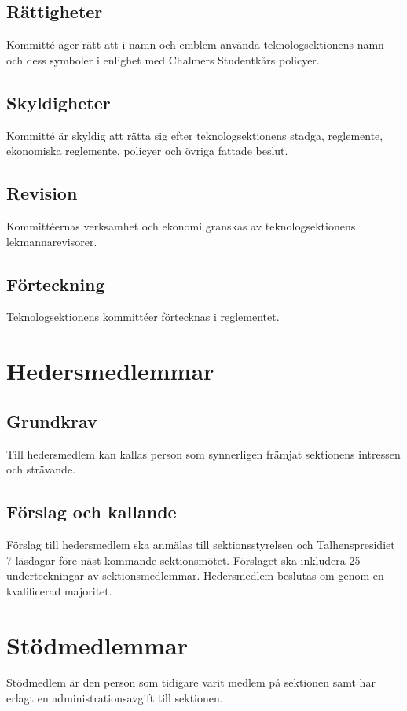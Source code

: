 \documentclass[a4paper]{dtek}
\begin{document}
\subsection{Rättigheter}
Kommitté äger rätt att i namn och emblem använda teknologsektionens namn och dess symboler i enlighet med Chalmers Studentkårs policyer.
\subsection{Skyldigheter}
Kommitté är skyldig att rätta sig efter teknologsektionens stadga, reglemente, ekonomiska reglemente, policyer och övriga fattade beslut.
\subsection{Revision}
Kommittéernas verksamhet och ekonomi granskas av teknologsektionens lekmannarevisorer.
\subsection{Förteckning}
Teknologsektionens kommittéer förtecknas i reglementet.
\newpage

\section{Hedersmedlemmar}
\subsection{Grundkrav}
Till hedersmedlem kan kallas person som synnerligen främjat sektionens intressen och strävande.
\subsection{Förslag och kallande}
Förslag till hedersmedlem ska anmälas till sektionsstyrelsen och Talhenspresidiet 7 läsdagar före näst kommande sektionsmötet.
Förslaget ska inkludera 25 underteckningar av sektionsmedlemmar.
Hedersmedlem beslutas om genom en kvalificerad majoritet.
\newpage

\section{Stödmedlemmar}
Stödmedlem är den person som tidigare varit medlem på sektionen samt har erlagt en administrationsavgift till sektionen.
\newpage

\end{document}
